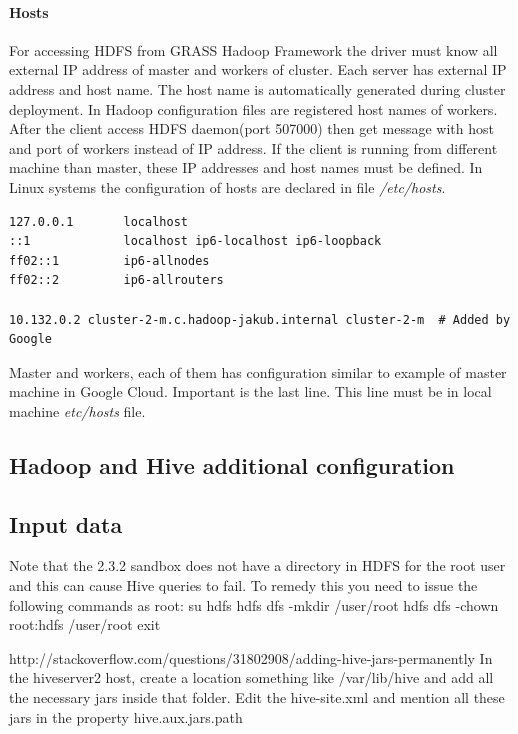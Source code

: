 \documentclass[a4paper,12pt,oneside]{report}
\begin{document}
\paragraph{Hosts} For accessing HDFS from GRASS Hadoop Framework the driver must know all external IP address of master and workers of cluster. Each server has external IP address and host name. The host name is automatically generated during cluster deployment. In Hadoop configuration files are registered host names of workers. After the client access HDFS daemon(port 507000) then get message with host and port of workers instead of IP address. If the client is running from different machine than master, these IP addresses and host names must be defined. In Linux systems the configuration of hosts  are declared in file \textit{/etc/hosts}. 
\begin{footnotesize}
\begin{lstlisting}[style=python]
127.0.0.1       localhost
::1             localhost ip6-localhost ip6-loopback
ff02::1         ip6-allnodes
ff02::2         ip6-allrouters

10.132.0.2 cluster-2-m.c.hadoop-jakub.internal cluster-2-m  # Added by Google
\end{lstlisting}
\end{footnotesize}
Master and workers, each of them has configuration similar to example of master machine in Google Cloud. Important is the  last line. This line must be in local machine \textit{etc/hosts} file.

\subsection{Hadoop and Hive additional configuration}



\subsection{Input data}
Note that the 2.3.2 sandbox does not have a directory in HDFS for the root user and this can cause Hive queries to fail. To remedy this you need to issue the following commands as root:
su hdfs
hdfs dfs -mkdir /user/root
hdfs dfs -chown root:hdfs /user/root
exit
	



http://stackoverflow.com/questions/31802908/adding-hive-jars-permanently
In the hiveserver2 host, create a location something like /var/lib/hive and add all the necessary jars inside that folder. Edit the hive-site.xml and mention all these jars in the property hive.aux.jars.path
\end{document}
